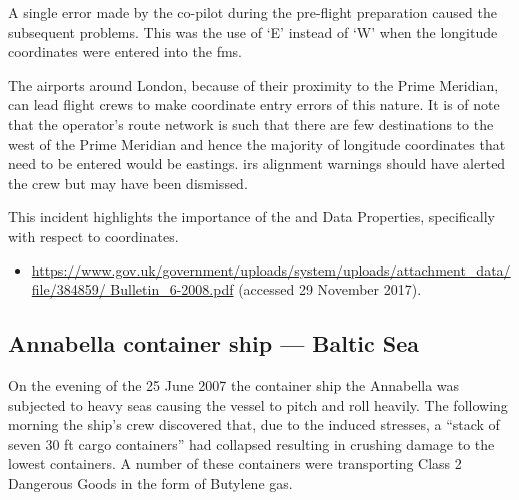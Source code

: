 A single error made by the co-pilot during the pre-flight preparation caused the subsequent problems. This was the use of `E' instead of `W' when the longitude coordinates were entered into the \gls{fms}.

The airports around London, because of their proximity to the Prime Meridian, can lead flight crews to make coordinate entry errors of this nature. It is of note that the operator's route network is such that there are few destinations to the west of the Prime Meridian and hence the majority of longitude coordinates that need to be entered would be eastings. \gls{irs} alignment warnings should have alerted the crew but may have been dismissed.

This incident highlights the importance of the  and  Data Properties, specifically with respect to coordinates.

\begin{samepage}
\begin{itemize}
  \item \raggedright{\href{https://www.gov.uk/government/uploads/system/uploads/attachment_data/file/384859/Bulletin_6-2008.pdf}{https://www.gov.uk/government/uploads/system/uploads/attachment\_data/file/384859/ Bulletin\_6-2008.pdf} (accessed 29 November 2017).}
\end{itemize}
\end{samepage}

\subsection{Annabella container ship --- Baltic Sea} \label{bkm:incacc:annabella}
On the evening of the 25 June 2007 the container ship the Annabella was subjected to heavy seas causing the vessel to pitch and roll heavily. The following morning the ship’s crew discovered that, due to the induced stresses, a ``stack of seven 30 ft cargo containers'' had collapsed resulting in crushing damage to the lowest containers. A number of these containers were transporting Class 2 Dangerous Goods in the form of Butylene gas.
 
